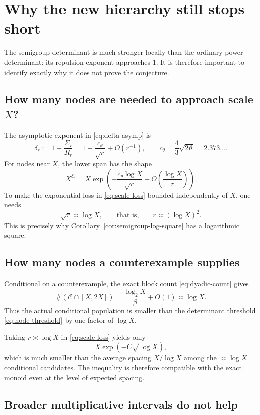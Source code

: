 \documentclass[11pt,oneside]{article}
\theoremstyle{definition}
\theoremstyle{remark}
\newcommand{\thetaq}{\vartheta}
\newcommand{\Cand}{\mathcal C}
\begin{document}
\section{Why the new hierarchy still stops short}
\label{sec:deficit}

The semigroup determinant is much stronger locally than the ordinary-power determinant: its
repulsion exponent approaches $1$.  It is therefore important to identify exactly why it does
not prove the conjecture.

\subsection{How many nodes are needed to approach scale $X$?}

The asymptotic exponent in \eqref{eq:delta-asymp} is
\[
 \delta_r:=1-\frac{\Sigma_r}{R_r}
 =1-\frac{c_\theta}{\sqrt r}+O(r^{-1}),
 \qquad
 c_\theta=\frac43\sqrt{2\thetaq}=2.373\ldots.
\]
For nodes near $X$, the lower span has the shape
\[
 X^{\delta_r}
 =X\exp\!\left(-\frac{c_\theta\log X}{\sqrt r}+O\!\left(\frac{\log X}{r}\right)\right).
 \label{eq:scale-loss}
\]
To make the exponential loss in \eqref{eq:scale-loss} bounded independently of $X$, one needs
\[
 \sqrt r\asymp\log X,
 \qquad\text{that is,}\qquad
 r\asymp(\log X)^2.
 \label{eq:node-threshold}
\]
This is precisely why Corollary~\ref{cor:semigroup-log-square} has a logarithmic square.

\subsection{How many nodes a counterexample supplies}

Conditional on a counterexample, the exact block count \eqref{eq:dyadic-count} gives
\[
 \#(\Cand\cap[X,2X])
 =\frac{\log_2X}{\beta}+O(1)
 \asymp\log X.
 \label{eq:conditional-log-population}
\]
Thus the actual conditional population is smaller than the determinant threshold
\eqref{eq:node-threshold} by one factor of $\log X$.

Taking $r\asymp\log X$ in \eqref{eq:scale-loss} yields only
\[
 X\exp(-C\sqrt{\log X}),
\]
which is much smaller than the average spacing $X/\log X$ among the
$\asymp\log X$ conditional candidates.  The inequality is therefore compatible with the
exact monoid even at the level of expected spacing.

\subsection{Broader multiplicative intervals do not help}
\end{document}
